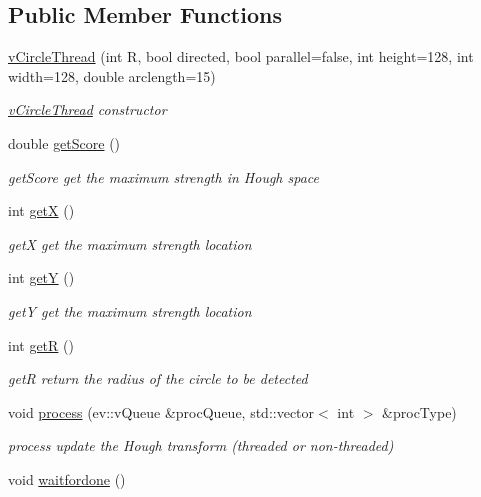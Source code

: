 \subsection*{Public Member Functions}
\begin{DoxyCompactItemize}
\item 
\hyperlink{classvCircleThread_adb0ce9432b9fe2a8d853c63b764d7859}{v\+Circle\+Thread} (int R, bool directed, bool parallel=false, int height=128, int width=128, double arclength=15)
\begin{DoxyCompactList}\small\item\em \hyperlink{classvCircleThread}{v\+Circle\+Thread} constructor \end{DoxyCompactList}\item 
double \hyperlink{classvCircleThread_a692a1066ee63c2716998fcb3a7aa513d}{get\+Score} ()
\begin{DoxyCompactList}\small\item\em get\+Score get the maximum strength in Hough space \end{DoxyCompactList}\item 
int \hyperlink{classvCircleThread_a0feac9f937bfeecc2dc0b015f9e8161c}{getX} ()
\begin{DoxyCompactList}\small\item\em getX get the maximum strength location \end{DoxyCompactList}\item 
int \hyperlink{classvCircleThread_a4f39898c53c3178b84b28c8cc33ec352}{getY} ()
\begin{DoxyCompactList}\small\item\em getY get the maximum strength location \end{DoxyCompactList}\item 
int \hyperlink{classvCircleThread_a024aa1ad0a7855fad146425c80feadb0}{getR} ()
\begin{DoxyCompactList}\small\item\em getR return the radius of the circle to be detected \end{DoxyCompactList}\item 
void \hyperlink{classvCircleThread_ad5f114e5609dd616c9eae9d1755d12c1}{process} (ev\+::v\+Queue \&proc\+Queue, std\+::vector$<$ int $>$ \&proc\+Type)
\begin{DoxyCompactList}\small\item\em process update the Hough transform (threaded or non-\/threaded) \end{DoxyCompactList}\item 
void \hyperlink{classvCircleThread_a0d32749f12d2d93ff0d9ccdf37422ccf}{waitfordone} ()\hypertarget{classvCircleThread_a0d32749f12d2d93ff0d9ccdf37422ccf}{}\label{classvCircleThread_a0d32749f12d2d93ff0d9ccdf37422ccf}


\end{DoxyCompactItemize}
